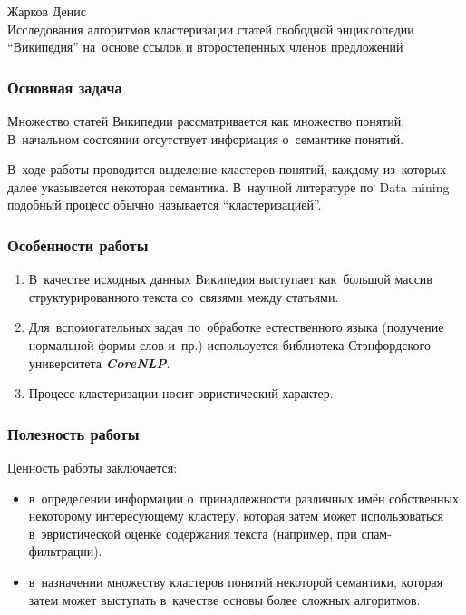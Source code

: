 \documentclass{beamer}
\newcommand{\MARK}[1]{{\bf {\it #1}}}
\begin{document}
\sloppy

\begin{frame}
\begin{center}
Жарков Денис\\
\vspace{1cm}
{\Large Исследования алгоритмов кластеризации статей свободной энциклопедии ``Википедия'' 
на~основе ссылок и второстепенных членов предложений}
\end{center}
\end{frame}

\begin{frame}
\frametitle{Основная задача}
Множество статей Википедии рассматривается как множество понятий.
В~начальном состоянии отсутствует информация о~семантике понятий. 

\vspace{1cm}

В~ходе работы проводится выделение кластеров понятий, каждому из~которых далее указывается некоторая семантика.
В~научной литературе по~Data mining подобный процесс обычно называется ``кластеризацией''.
\end{frame}

\begin{frame}
\frametitle{Особенности работы}
\begin{enumerate}
\item {
В~качестве исходных данных Википедия выступает как~большой массив структурированного текста со~связями между статьями.
}
\item {
Для~вспомогательных задач по~обработке естественного языка (получение нормальной формы слов и~пр.) 
используется библиотека Стэнфордского университета \MARK{CoreNLP}.
}
\item{
Процесс кластеризации носит эвристический характер.
}
\end{enumerate}
\end{frame}

\begin{frame}
\frametitle{Полезность работы}
Ценность работы заключается:
\begin{itemize}
\item {
в~определении информации о~принадлежности различных имён собственных некоторому интересующему кластеру,
которая затем может использоваться в~эвристической оценке содержания текста (например, при спам-фильтрации).
}

\item {
в~назначении множеству кластеров понятий некоторой семантики, 
которая затем может выступать в~качестве основы более сложных алгоритмов.
}
\end{itemize}
\end{frame}
\end{document}
